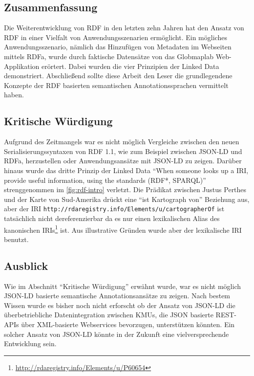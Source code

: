 \documentclass[../main.tex]{subfiles}
\begin{document}
\subsection{Zusammenfassung}

Die Weiterentwicklung von RDF in den letzten zehn Jahren hat den Ansatz von RDF in einer Vielfalt von Anwendungsszenarien ermöglicht. Ein mögliches Anwendungsszenario, nämlich das Hinzufügen von Metadaten im Webseiten mittels RDFa, wurde durch faktische Datensätze von das Globmaplab Web-Applikation erörtert. Dabei wurden die vier Prinzipien der Linked Data demonstriert. Abschließend sollte diese Arbeit den Leser die grundlegendene Konzepte der RDF basierten semantischen Annotationssprachen vermittelt haben.

\subsection{Kritische Würdigung}
Aufgrund des Zeitmangels war es nicht möglich Vergleiche zwischen den neuen Serialisierungssyntaxen von RDF 1.1, wie zum Beispiel zwischen JSON-LD und RDFa, herzustellen oder Anwendungsansätze mit JSON-LD zu zeigen. Darüber hinaus wurde das dritte Prinzip der Linked Data \hyphenquote{german}{When someone looks up a IRI, provide useful information, using the standards (RDF*, SPARQL)} strenggenommen im \autoref{fig:rdf-intro} verletzt. Die Prädikat zwischen Justus Perthes und der Karte von Sud-Amerika drückt eine \hyphenquote{german}{ist Kartograph von} Beziehung aus, aber der IRI \texttt{http://rdaregistry.info/Elements/u/cartographerOf} ist tatsächlich nicht dereferenzierbar da es nur einen lexikalischen Alias des kanonischen IRIs\footnote{\url{http://rdaregistry.info/Elements/u/P60654}} ist. Aus illustrative Gründen wurde aber der lexikalische IRI benutzt. 

\subsection{Ausblick}
Wie im Abschnitt \hyphenquote{german}{Kritische Würdigung} erwähnt wurde, war es nicht möglich JSON-LD basierte semantische Annotationsansätze zu zeigen. Nach bestem Wissen wurde es bisher noch nicht erforscht ob der Ansatz von JSON-LD die überbetriebliche Datenintegration zwischen KMUs, die JSON basierte REST-APIs über XML-basierte Webservices bevorzugen, unterstützen könnten\footnotemark{}. Ein solcher Ansatz von JSON-LD könnte in der Zukunft eine vielversprechende Entwicklung sein.
\end{document}
